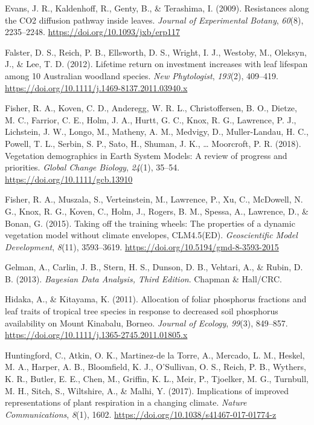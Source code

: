 \documentclass[
  12pt,
  letterpaper,
  DIV=11,
  numbers=noendperiod]{scrartcl}
\newlength{\cslhangindent}
\newlength{\cslentryspacingunit} %
\newenvironment{CSLReferences}[2] %
 {%
  \setlength{\parindent}{0pt}
  \ifodd #1
  \let\oldpar\par
  \def\par{\hangindent=\cslhangindent\oldpar}
  \fi
  \setlength{\parskip}{#2\cslentryspacingunit}
 }%
 {}
\begin{document}
\begin{CSLReferences}{1}{0}
\leavevmode{}%
Evans, J. R., Kaldenhoff, R., Genty, B., \& Terashima, I. (2009).
Resistances along the {CO2} diffusion pathway inside leaves.
\emph{Journal of Experimental Botany}, \emph{60}(8), 2235--2248.
\url{https://doi.org/10.1093/jxb/erp117}

\leavevmode{}%
Falster, D. S., Reich, P. B., Ellsworth, D. S., Wright, I. J., Westoby,
M., Oleksyn, J., \& Lee, T. D. (2012). Lifetime return on investment
increases with leaf lifespan among 10 {Australian} woodland species.
\emph{New Phytologist}, \emph{193}(2), 409--419.
\url{https://doi.org/10.1111/j.1469-8137.2011.03940.x}

\leavevmode{}%
Fisher, R. A., Koven, C. D., Anderegg, W. R. L., Christoffersen, B. O.,
Dietze, M. C., Farrior, C. E., Holm, J. A., Hurtt, G. C., Knox, R. G.,
Lawrence, P. J., Lichstein, J. W., Longo, M., Matheny, A. M., Medvigy,
D., Muller-Landau, H. C., Powell, T. L., Serbin, S. P., Sato, H.,
Shuman, J. K., \ldots{} Moorcroft, P. R. (2018). Vegetation demographics
in {Earth System Models}: {A} review of progress and priorities.
\emph{Global Change Biology}, \emph{24}(1), 35--54.
\url{https://doi.org/10.1111/gcb.13910}

\leavevmode{}%
Fisher, R. A., Muszala, S., Verteinstein, M., Lawrence, P., Xu, C.,
McDowell, N. G., Knox, R. G., Koven, C., Holm, J., Rogers, B. M.,
Spessa, A., Lawrence, D., \& Bonan, G. (2015). Taking off the training
wheels: The properties of a dynamic vegetation model without climate
envelopes, {CLM4}.5({ED}). \emph{Geoscientific Model Development},
\emph{8}(11), 3593--3619. \url{https://doi.org/10.5194/gmd-8-3593-2015}

\leavevmode{}%
Gelman, A., Carlin, J. B., Stern, H. S., Dunson, D. B., Vehtari, A., \&
Rubin, D. B. (2013). \emph{Bayesian {Data Analysis}, {Third Edition}}.
{Chapman \& Hall/CRC}.

\leavevmode{}%
Hidaka, A., \& Kitayama, K. (2011). Allocation of foliar phosphorus
fractions and leaf traits of tropical tree species in response to
decreased soil phosphorus availability on {Mount Kinabalu}, {Borneo}.
\emph{Journal of Ecology}, \emph{99}(3), 849--857.
\url{https://doi.org/10.1111/j.1365-2745.2011.01805.x}

\leavevmode{}%
Huntingford, C., Atkin, O. K., Martinez-de la Torre, A., Mercado, L. M.,
Heskel, M. A., Harper, A. B., Bloomfield, K. J., O'Sullivan, O. S.,
Reich, P. B., Wythers, K. R., Butler, E. E., Chen, M., Griffin, K. L.,
Meir, P., Tjoelker, M. G., Turnbull, M. H., Sitch, S., Wiltshire, A., \&
Malhi, Y. (2017). Implications of improved representations of plant
respiration in a changing climate. \emph{Nature Communications},
\emph{8}(1), 1602. \url{https://doi.org/10.1038/s41467-017-01774-z}


\end{CSLReferences}
\end{document}
